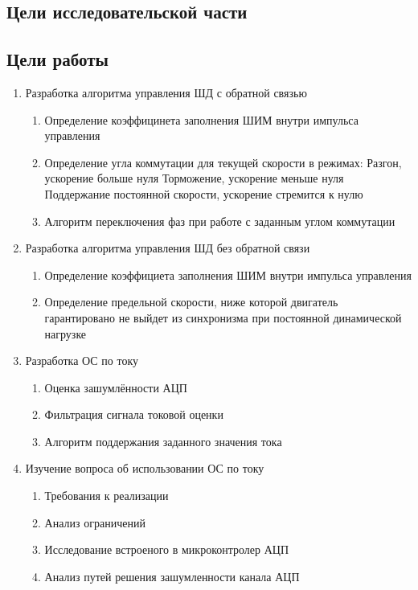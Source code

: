 \ifdefined\DIPLOMA
    \subsection{Цели исследовательской части}
\else
    \subsection{Цели работы}
\fi

\begin{enumerate}
    \item{Разработка алгоритма управления ШД с обратной связью}
    \begin{enumerate}
        \item Определение коэффицинета заполнения ШИМ внутри импульса управления
        \item Определение угла коммутации для текущей скорости в режимах:
            \subitem Разгон, ускорение больше нуля
            \subitem Торможение, ускорение меньше нуля
            \subitem Поддержание постоянной скорости, ускорение стремится к нулю
        \item Алгоритм переключения фаз при работе с заданным углом коммутации
    \end{enumerate}

    \item{Разработка алгоритма управления ШД без обратной связи}
        \begin{enumerate}
            \item Определение коэффициета заполнения ШИМ внутри импульса управления
            \item Определение предельной скорости, ниже которой двигатель гарантировано не выйдет из
                синхронизма при постоянной динамической нагрузке
        \end{enumerate}

\ifdefined\DIPLOMA
    \item{Разработка ОС по току}
        \begin{enumerate}
            \item Оценка зашумлённости АЦП
            \item Фильтрация сигнала токовой оценки
            \item Алгоритм поддержания заданного значения тока
        \end{enumerate}
\else
    \item{Изучение вопроса об использовании ОС по току}
        \begin{enumerate}
            \item Требования к реализации
            \item Анализ ограничений
            \item Исследование встроеного в микроконтролер АЦП
            \item Анализ путей решения зашумленности канала АЦП
        \end{enumerate}
\fi


\end{enumerate}
